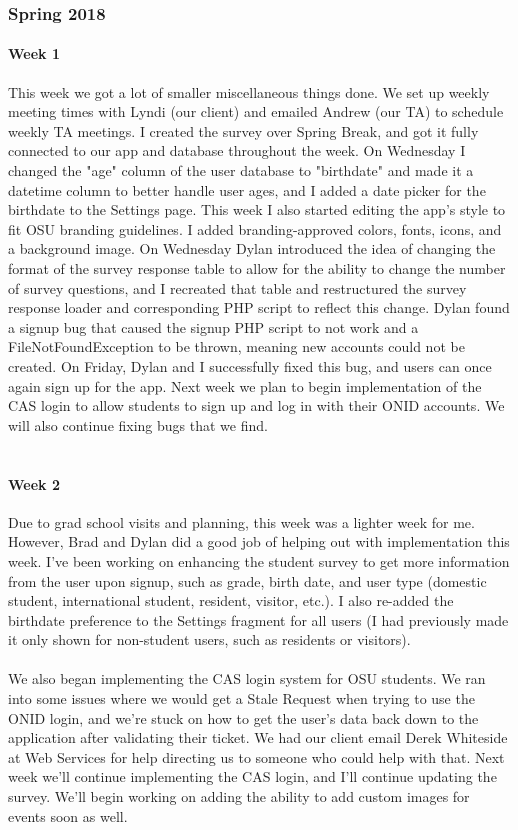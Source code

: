 \documentclass[onecolumn, draftclsnofoot,10pt, compsoc]{IEEEtran}
\begin{document}
    \subsubsection{Spring 2018}
      \paragraph{Week 1}
      This week we got a lot of smaller miscellaneous things done. We set up weekly meeting times with Lyndi (our client) and emailed Andrew (our TA) to schedule weekly TA meetings. I created the survey over Spring Break, and got it fully connected to our app and database throughout the week. On Wednesday I changed the "age" column of the user database to "birthdate" and made it a datetime column to better handle user ages, and I added a date picker for the birthdate to the Settings page. This week I also started editing the app's style to fit OSU branding guidelines. I added branding-approved colors, fonts, icons, and a background image. On Wednesday Dylan introduced the idea of changing the format of the survey response table to allow for the ability to change the number of survey questions, and I recreated that table and restructured the survey response loader and corresponding PHP script to reflect this change. Dylan found a signup bug that caused the signup PHP script to not work and a FileNotFoundException to be thrown, meaning new accounts could not be created. On Friday, Dylan and I successfully fixed this bug, and users can once again sign up for the app. Next week we plan to begin implementation of the CAS login to allow students to sign up and log in with their ONID accounts. We will also continue fixing bugs that we find. \\ \\

      \paragraph{Week 2}
      Due to grad school visits and planning, this week was a lighter week for me. However, Brad and Dylan did a good job of helping out with implementation this week. I've been working on enhancing the student survey to get more information from the user upon signup, such as grade, birth date, and user type (domestic student, international student, resident, visitor, etc.). I also re-added the birthdate preference to the Settings fragment for all users (I had previously made it only shown for non-student users, such as residents or visitors). \\ \\
      We also began implementing the CAS login system for OSU students. We ran into some issues where we would get a Stale Request when trying to use the ONID login, and we're stuck on how to get the user's data back down to the application after validating their ticket. We had our client email Derek Whiteside at Web Services for help directing us to someone who could help with that. Next week we'll continue implementing the CAS login, and I'll continue updating the survey. We'll begin working on adding the ability to add custom images for events soon as well. \\ \\
\end{document}
